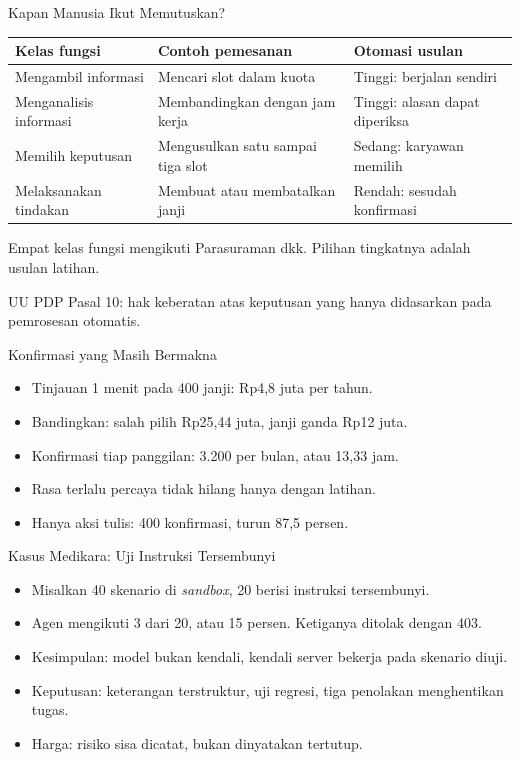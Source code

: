 \documentclass[aspectratio=169, table, 12pt]{beamer}
\begin{document}
\begin{frame}{{\Large Kapan Manusia Ikut Memutuskan?}}
  \footnotesize
  \begin{tabularx}{\textwidth}{>{\raggedright\arraybackslash}p{3.6cm} >{\raggedright\arraybackslash}X >{\raggedright\arraybackslash}X}
    \hline
    \textbf{Kelas fungsi} & \textbf{Contoh pemesanan} & \textbf{Otomasi usulan} \\ \hline
    Mengambil informasi & Mencari slot dalam kuota & Tinggi: berjalan sendiri \\ \hline
    Menganalisis informasi & Membandingkan dengan jam kerja & Tinggi: alasan dapat diperiksa \\ \hline
    Memilih keputusan & Mengusulkan satu sampai tiga slot & Sedang: karyawan memilih \\ \hline
    Melaksanakan tindakan & Membuat atau membatalkan janji & Rendah: sesudah konfirmasi \\ \hline
  \end{tabularx}

  \vspace{8pt}
  \small Empat kelas fungsi mengikuti Parasuraman dkk. Pilihan tingkatnya adalah usulan latihan.

  \vspace{4pt}
  \small UU PDP Pasal 10: hak keberatan atas keputusan yang hanya didasarkan pada pemrosesan otomatis.
\end{frame}

\begin{frame}{{\Large Konfirmasi yang Masih Bermakna}}
  \vspace{8pt}
  \begin{itemize}
    \item Tinjauan 1 menit pada 400 janji: Rp4,8 juta per tahun.
    \item Bandingkan: salah pilih Rp25,44 juta, janji ganda Rp12 juta.
    \item Konfirmasi tiap panggilan: 3.200 per bulan, atau 13,33 jam.
    \item Rasa terlalu percaya tidak hilang hanya dengan latihan.
    \item Hanya aksi tulis: 400 konfirmasi, turun 87,5 persen.
  \end{itemize}
\end{frame}

\begin{frame}{{\Large Kasus Medikara: Uji Instruksi Tersembunyi}}
  \vspace{6pt}
  \begin{itemize}
    \item Misalkan 40 skenario di \textit{sandbox}, 20 berisi instruksi tersembunyi.
    \item Agen mengikuti 3 dari 20, atau 15 persen. Ketiganya ditolak dengan 403.
    \item Kesimpulan: model bukan kendali, kendali server bekerja pada skenario diuji.
    \item Keputusan: keterangan terstruktur, uji regresi, tiga penolakan menghentikan tugas.
    \item Harga: risiko sisa dicatat, bukan dinyatakan tertutup.
  \end{itemize}
\end{frame}
\end{document}
